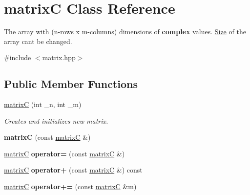 \hypertarget{classmatrix_c}{}\section{matrixC Class Reference}
\label{classmatrix_c}


The array with (n-\/rows x m-\/columns) dimensions of {\bfseries complex} values. \mbox{\hyperlink{struct_size}{Size}} of the array can\textquotesingle{}t be changed.  




{\ttfamily \#include $<$matrix.\+hpp$>$}

\subsection*{Public Member Functions}
\begin{DoxyCompactItemize}
\item 
\mbox{\label{classmatrix_c_af6a11558b8cecaa782216065efc9779e}} 
\mbox{\hyperlink{classmatrix_c_af6a11558b8cecaa782216065efc9779e}{matrixC}} (int \+\_\+n, int \+\_\+m)
\begin{DoxyCompactList}\small\item\em Creates and initializes new matrix. \end{DoxyCompactList}\item 
\mbox{\label{classmatrix_c_a192c20453e6d7feec6566789e740fa41}} 
{\bfseries matrixC} (const \mbox{\hyperlink{classmatrix_c}{matrixC}} \&)
\item 
\mbox{\label{classmatrix_c_ac0bbe7cec74175a4b33d9c4695f09c38}} 
\mbox{\hyperlink{classmatrix_c}{matrixC}} {\bfseries operator=} (const \mbox{\hyperlink{classmatrix_c}{matrixC}} \&)
\item 
\mbox{\label{classmatrix_c_a54eb9c60036ded09ba24edc0f561abcc}} 
\mbox{\hyperlink{classmatrix_c}{matrixC}} {\bfseries operator+} (const \mbox{\hyperlink{classmatrix_c}{matrixC}} \&) const
\item 
\mbox{\label{classmatrix_c_a033b3655af1c81c08cfb0d065a871dcc}} 
\mbox{\hyperlink{classmatrix_c}{matrixC}} {\bfseries operator+=} (const \mbox{\hyperlink{classmatrix_c}{matrixC}} \&m)
\item 
\mbox{\label{classmatrix_c_a91586bd1a69f33e5d1b248bd7a96e3c0}} 

\end{DoxyCompactItemize}
